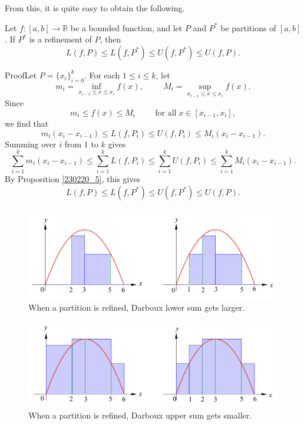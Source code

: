 From this, it is quite easy to obtain the following. 
\begin{theorem}[label=230220_6]{}
Let $f:[a,b]\to\mathbb{R}$ be a bounded function, and let $P$ and $P^*$ be   partitions of $[a,b]$. If $P^*$ is a refinement of $P$, then
\[L(f,P)\leq L(f,P^*)\leq U(f,P^*)\leq U(f,P).\]

\end{theorem}
\begin{myproof}{Proof}Let $P=\{x_i\}_{i=0}^k$. For each $1\leq i\leq k$, 
let
\[m_i=\inf_{x_{i-1}\leq x\leq x_i}f(x),\hspace{1cm}M_i=\sup_{x_{i-1}\leq x\leq x_i}f(x).\]
Since 
\[m_i\leq f(x)\leq M_i\hspace{1cm}\text{for all}\;x\in [x_{i-1}, x_i],\]
we find that
\[m_i(x_i-x_{i-1})\leq L(f, P_i)\leq U(f,P_i)\leq M_i(x_i-x_{i-1}).\]Summing over $i$ from $1$ to $k$ gives
\[\sum_{i=1}^{k}m_i(x_i-x_{i-1})\leq\sum_{i=1}^{k} L(f, P_i)\leq \sum_{i=1}^{k}U(f,P_i)\leq \sum_{i=1}^{k}M_i(x_i-x_{i-1}).\]By Proposition \ref{230220_5}, this gives
\[L(f,P)\leq L(f,P^*)\leq U(f,P^*)\leq U(f,P).\]
\end{myproof}

\begin{figure}[ht]
\centering
\includegraphics[scale=0.2]{Picture40.png}
\caption{When a partition is refined, Darboux lower sum gets larger.\fa}\label{figure40}
\end{figure}

\begin{figure}[ht]
\centering
\includegraphics[scale=0.2]{Picture41.png}
\caption{When a partition is refined, Darboux upper sum gets smaller.\fa}\label{figure41}
\end{figure}

